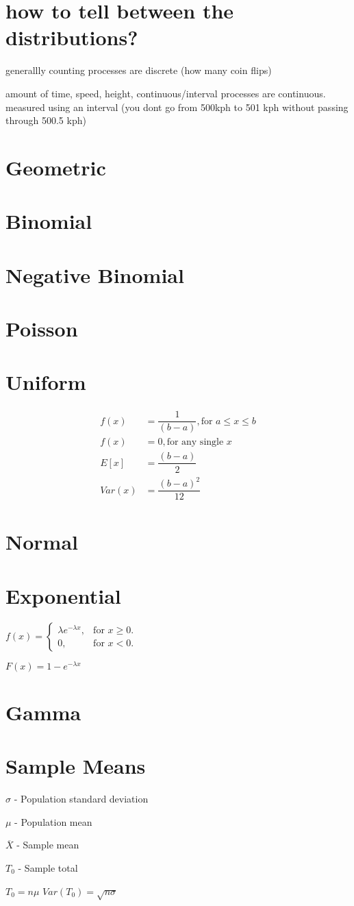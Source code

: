 \documentclass[12pt,fleqn]{article}
\begin{document}

\section{how to tell between the distributions?}

generallly counting processes are discrete (how many coin flips)

amount of time, speed, height, continuous/interval processes are continuous. measured using an interval (you dont go from 500kph to 501 kph without passing through 500.5 kph)



\section{Geometric}
\section{Binomial}
\section{Negative Binomial}
\section{Poisson}
\section{Uniform}

\begin{align*}
	f(x) &= \dfrac{1}{(b-a)}, \text{for $a \le x \le b$}\\
	f(x) &= 0, \text{for any single $x$}\\
	E[x] &= \dfrac{(b-a)}{2}\\
	Var(x) &=\dfrac{(b-a)^2}{12}
\end{align*}

\section{Normal}
\section{Exponential}


$
f(x)=\begin{cases}
\lambda e^{-\lambda x}, & \text{for $x\ge0$}.\\
0, & \text{for $x<0$}.
\end{cases}
$

$ F(x)=1-e^{-\lambda x} $
\section{Gamma}


\section{Sample Means}

$\sigma$ - Population standard deviation

$\mu$ - Population mean

$\overline{X}$ - Sample mean

$T_0$ - Sample total


$T_0 = n\mu$
$Var(T_0) = \sqrt{n\sigma} $
\end{document}
